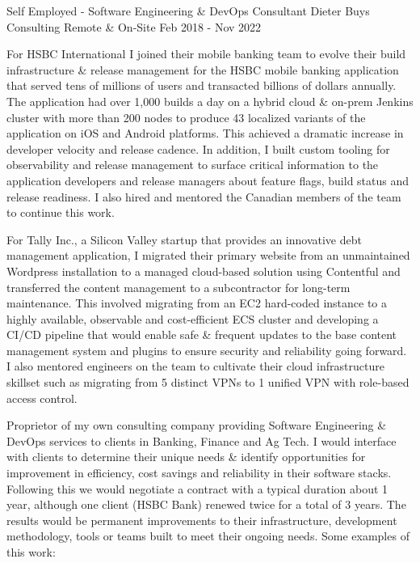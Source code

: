 \begin{cventries}
\cventrywithsummary
{Self Employed - Software Engineering \& DevOps Consultant} %
{Dieter Buys Consulting} %
{Remote \& On-Site} %
{Feb 2018 - Nov 2022} %
{
  \begin{cvitems} %
    \item {For HSBC International I joined their mobile banking team to evolve their build infrastructure \& release management for the HSBC mobile banking application that served tens of millions of users and transacted billions of dollars annually. The application had over 1,000 builds a day on a hybrid cloud \& on-prem Jenkins cluster with more than 200 nodes to produce 43 localized variants of the application on iOS and Android platforms. This achieved a dramatic increase in developer velocity and release cadence. In addition, I built custom tooling for observability and release management to surface critical information to the application developers and release managers about feature flags, build status and release readiness. I also hired and mentored the Canadian members of the team to continue this work.}
    \item {For Tally Inc., a Silicon Valley startup that provides an innovative debt management application, I migrated their primary website from an unmaintained Wordpress installation to a managed cloud-based solution using Contentful and transferred the content management to a subcontractor for long-term maintenance. This involved migrating from an EC2 hard-coded instance to a highly available, observable and cost-efficient ECS cluster and developing a CI/CD pipeline that would enable safe \& frequent updates to the base content management system and plugins to ensure security and reliability going forward. I also mentored engineers on the team to cultivate their cloud infrastructure skillset such as migrating from 5 distinct VPNs to 1 unified VPN with role-based access control.}
  \end{cvitems}
}
{
  Proprietor of my own consulting company providing Software Engineering \& DevOps services to clients in Banking, Finance and Ag Tech. I would interface with clients to determine their unique needs \& identify opportunities for improvement in efficiency, cost savings and reliability in their software stacks. Following this we would negotiate a contract with a typical duration about 1 year, although one client (HSBC Bank) renewed twice for a total of 3 years. The results would be permanent improvements to their infrastructure, development methodology, tools or teams built to meet their ongoing needs. Some examples of this work:
}


\end{cventries}
